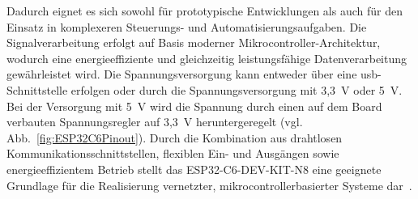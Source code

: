 Dadurch eignet es sich sowohl für prototypische Entwicklungen als auch für den Einsatz in komplexeren Steuerungs- und Automatisierungsaufgaben. 
Die Signalverarbeitung erfolgt auf Basis moderner Mikrocontroller-Architektur, wodurch eine energieeffiziente und gleichzeitig leistungsfähige Datenverarbeitung gewährleistet wird.
Die Spannungsversorgung kann entweder über eine \gls{usb}-Schnittstelle erfolgen oder durch die Spannungsversorgung mit 3,3~V oder 5~V. 
Bei der Versorgung mit 5~V wird die Spannung durch einen auf dem Board verbauten Spannungsregler auf 3,3~V heruntergeregelt (vgl. Abb.~\ref{fig:ESP32C6Pinout}).  
Durch die Kombination aus drahtlosen Kommunikationsschnittstellen, flexiblen Ein- und Ausgängen sowie energieeffizientem Betrieb stellt das ESP32-C6-DEV-KIT-N8 eine geeignete Grundlage für die Realisierung vernetzter, mikrocontrollerbasierter Systeme dar~\cite{WaveshareESP32C6}.